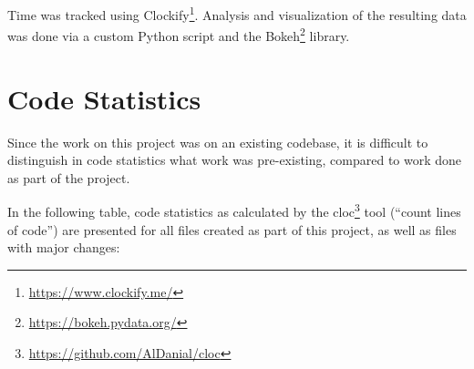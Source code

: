 Time was tracked using Clockify\footnote{\url{https://www.clockify.me/}}.
Analysis and visualization of the resulting data was done via a custom Python
script and the Bokeh\footnote{\url{https://bokeh.pydata.org/}} library.


\section{Code Statistics}
Since the work on this project was on an existing codebase, it is difficult to
distinguish in code statistics what work was pre-existing, compared to work done
as part of the project.

In the following table, code statistics as calculated by the
cloc\footnote{\url{https://github.com/AlDanial/cloc}} tool (``count lines of
code'') are presented for all files created as part of this project, as well as
files with major changes:

